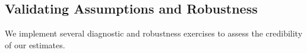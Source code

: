 \documentclass[sigconf]{acmart}
\begin{document}

\subsection{Validating Assumptions and Robustness}
\label{subsec:robustness}

We implement several diagnostic and robustness exercises to assess the credibility of our estimates.
\end{document}
